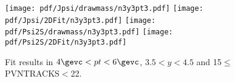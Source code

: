 \begin{figure}[H]
\begin{center}
\texttt{[image: pdf/Jpsi/drawmass/n3y3pt3.pdf]}
\texttt{[image: pdf/Jpsi/2DFit/n3y3pt3.pdf]}
\vspace*{-0.5cm}
\texttt{[image: pdf/Psi2S/drawmass/n3y3pt3.pdf]}
\texttt{[image: pdf/Psi2S/2DFit/n3y3pt3.pdf]}
\vspace*{-0.5cm}
\end{center}
\caption{Fit results in $4\gevc<pt<6\gevc$, $3.5<y<4.5$ and 15$\leq$PVNTRACKS$<$22.}
\label{Fitn3y3pt3}
\end{figure}
